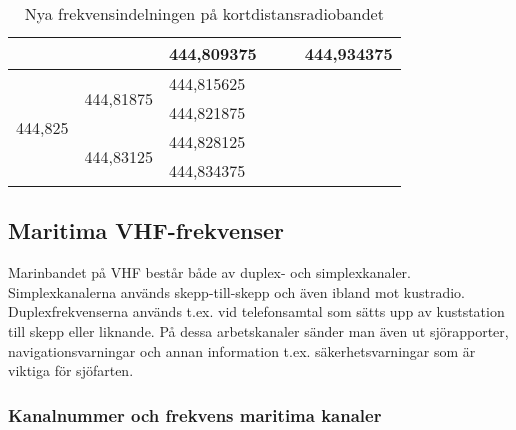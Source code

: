 \begin{table}[h]
\begin{tabular}{|l|l|l|l|l|l|}
		                                               &                                                 & 444,809375                      & \multicolumn{1}{l|}{}                         & \multicolumn{1}{l|}{}                           & \multicolumn{1}{l|}{444,934375} \\ \hline
		\multirow{4}{*}{444,825}                       & \multirow{2}{*}{444,81875}                      & 444,815625                      & \multicolumn{3}{l}{\multirow{4}{*}{}}                                                                                             \\ \cline{3-3}
		                                               &                                                 & 444,821875                      & \multicolumn{3}{l}{}                                                                                                              \\ \cline{2-3}
		                                               & \multirow{2}{*}{444,83125}                      & 444,828125                      & \multicolumn{3}{l}{}                                                                                                              \\ \cline{3-3}
		                                               &                                                 & 444,834375                      & \multicolumn{3}{l}{}                                                                                                              \\ \cline{1-3}
	\end{tabular}
\caption{Nya frekvensindelningen på kortdistansradiobandet}
\label{tab:SRBR-frekvenser}
\end{table}

\clearpage

\subsection{Maritima VHF-frekvenser}

Marinbandet på VHF består både av duplex- och
simplexkanaler. Simplexkanalerna används skepp-till-skepp och även
ibland mot kustradio. Duplexfrekvenserna används t.ex. vid
telefonsamtal som sätts upp av kuststation till skepp eller
liknande. På dessa arbetskanaler sänder man även ut sjörapporter,
navigationsvarningar och annan information t.ex. säkerhetsvarningar
som är viktiga för sjöfarten.

\subsubsection{Kanalnummer och frekvens maritima kanaler}

